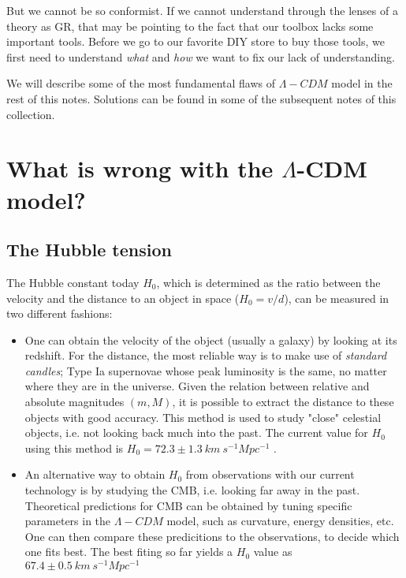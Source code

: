 \documentclass[11pt, a4paper]{article} %
\begin{document}
But we cannot be so conformist. If we cannot understand through the lenses of a theory as GR, that may be pointing to the fact that our toolbox lacks some important tools. Before we go to our favorite DIY store to buy those tools, we first need to understand \textit{what} and \textit{how} we want to fix our lack of understanding.

We will describe some of the most fundamental flaws of $\Lambda-CDM$ model in the rest of this notes. Solutions can be found in some of the subsequent notes of this collection.

\section*{What is wrong with the $\Lambda$-CDM model?}


\subsection*{The Hubble tension}

The Hubble constant today $H_{0}$, which is determined as the ratio between the velocity and the distance to an object in space ($H_{0} = v/d$), can be measured in two different fashions:

\begin{itemize}
	\item One can obtain the velocity of the object (usually a galaxy) by looking at its redshift. For the distance, the most reliable way is to make use of \textit{standard candles}; Type Ia supernovae whose peak luminosity is the same, no matter where they are in the universe. Given the relation between relative and absolute magnitudes $(m, M)$, it is possible to extract the distance to these objects with good accuracy. This method is used to study "close" celestial objects, i.e. not looking back much into the past. The current value for $H_{0}$ using this method is $H_{0} = 72.3 \pm 1.3 \: km \:s^{-1} Mpc^{-1}$ \cite{2020planck}.
	
	\item An alternative way to obtain $H_{0}$ from observations with our current technology is by studying the CMB, i.e. looking far away in the past. Theoretical predictions for CMB can be obtained by tuning specific parameters in the $\Lambda- CDM$ model, such as curvature, energy densities, etc. One can then compare these predicitions to the observations, to decide which one fits best. The best fiting so far yields a $H_{0}$ value as $67.4 \pm 0.5 \: km \:s^{-1} Mpc^{-1}$ \cite{Riess_2021}
\end{itemize}
\end{document}
